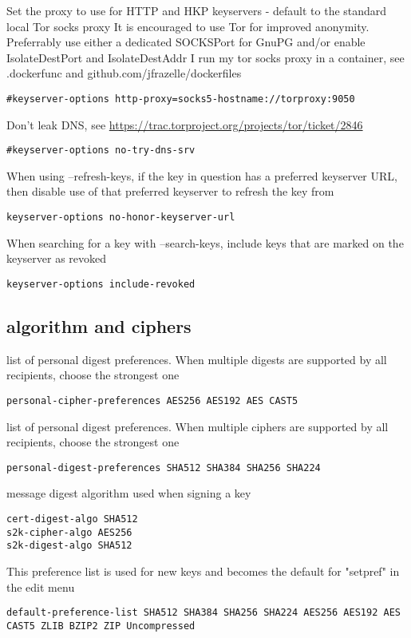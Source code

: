 \documentclass[11pt]{article}
\begin{document}
Set the proxy to use for HTTP and HKP keyservers - default to the standard local Tor socks proxy
It is encouraged to use Tor for improved anonymity. Preferrably use either a dedicated SOCKSPort for GnuPG and/or enable IsolateDestPort and IsolateDestAddr
I run my tor socks proxy in a container, see .dockerfunc and github.com/jfrazelle/dockerfiles
\begin{verbatim}
#keyserver-options http-proxy=socks5-hostname://torproxy:9050
\end{verbatim}

Don't leak DNS, see \url{https://trac.torproject.org/projects/tor/ticket/2846}
\begin{verbatim}
#keyserver-options no-try-dns-srv
\end{verbatim}


When using --refresh-keys, if the key in question has a preferred keyserver URL, then disable use of that preferred keyserver to refresh the key from
\begin{verbatim}
keyserver-options no-honor-keyserver-url
\end{verbatim}

When searching for a key with --search-keys, include keys that are marked on the keyserver as revoked
\begin{verbatim}
keyserver-options include-revoked
\end{verbatim}

\subsection{algorithm and ciphers}
\label{sec:org49c82d0}
list of personal digest preferences. When multiple digests are supported by all recipients, choose the strongest one
\begin{verbatim}
personal-cipher-preferences AES256 AES192 AES CAST5
\end{verbatim}

list of personal digest preferences. When multiple ciphers are supported by all recipients, choose the strongest one
\begin{verbatim}
personal-digest-preferences SHA512 SHA384 SHA256 SHA224
\end{verbatim}

message digest algorithm used when signing a key
\begin{verbatim}
cert-digest-algo SHA512
s2k-cipher-algo AES256
s2k-digest-algo SHA512
\end{verbatim}

This preference list is used for new keys and becomes the default for "setpref" in the edit menu
\begin{verbatim}
default-preference-list SHA512 SHA384 SHA256 SHA224 AES256 AES192 AES CAST5 ZLIB BZIP2 ZIP Uncompressed
\end{verbatim}
\end{document}
